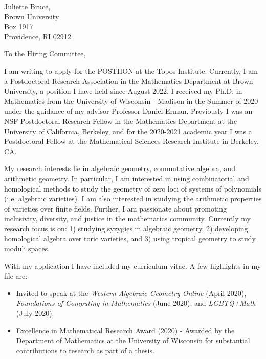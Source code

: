 \documentclass[11pt]{brownletter}
\date{October 9, 2022} %
\begin{document}
\begin{letter}{Juliette Bruce,\\ 
               Brown University\\ 
               Box 1917\\ 
               Providence, RI 02912}

\opening{To the Hiring Committee,}

I am writing to apply for the POSTIION at the Topos Institute. Currently, I am a Postdoctoral Research Association in the Mathematics Department at Brown University, a position I have held since August 2022. I received my Ph.D. in Mathematics from the University of Wisconsin - Madison in the Summer of 2020 under the guidance of my advisor Professor Daniel Erman. Previously I was an NSF Postdoctoral Research Fellow in the Mathematics Department at the University of California, Berkeley, and for the 2020-2021 academic year I was a Postdoctoral Fellow at the Mathematical Sciences Research Institute in Berkeley, CA.

My research interests lie in algebraic geometry, commutative algebra, and arithmetic geometry. In particular, I am interested in using combinatorial and homological methods to study the geometry of zero loci of systems of polynomials (i.e. algebraic varieties). I am also interested in studying the arithmetic properties of varieties over finite fields. Further, I am passionate about promoting inclusivity, diversity, and justice in the mathematics community. Currently my research focus  is on: 1) studying syzygies in algebraic geometry, 2) developing homological algebra over toric varieties, and 3) using tropical geometry to study moduli spaces.

With my application I have included my curriculum vitae. A few highlights in my file are:
\begin{itemize}
\item Invited to speak at the \textit{Western Algebraic Geometry Online} (April 2020), \textit{Foundations of Computing in Mathematics} (June 2020), and \textit{LGBTQ+Math} (July 2020).

\item Excellence in Mathematical Research Award (2020) - Awarded by the Department of Mathematics at the University of Wisconsin for substantial contributions to research as part of a thesis. 


\end{itemize}
\end{letter}
\end{document}
